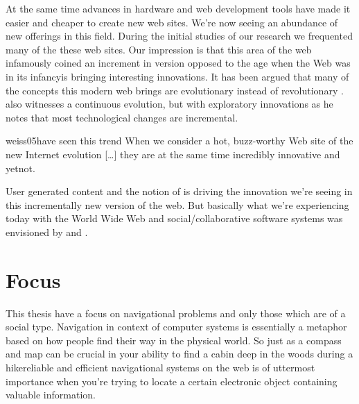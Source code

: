At the same time advances in hardware and web development tools have made it
easier and cheaper to create new web sites. We're now seeing an
abundance of new offerings in this field.
During the initial studies of our research we frequented
many of the these web sites. Our impression is that
this area of the web infamously coined \dash{}an
increment in version opposed to the age when the Web was in its
infancy\dash{}is bringing interesting innovations.
It has been argued that many of the concepts this modern web brings are
evolutionary instead of revolutionary \citep[]{yakovlev07}.
\citet[]{treese06} also witnesses a continuous evolution, but with
exploratory innovations as he notes that most technological changes are
incremental.%
\begin{fullquote}[\p{18}]{weiss05}{have seen this trend}
  When we consider a hot, buzz-worthy Web site of the new Internet evolution
  [\ldots]
  they are at the same time incredibly innovative and yet\dash{}not.
\end{fullquote}

User generated content and the notion of %
is driving the innovation we're seeing in this incrementally new version of
the web. But basically what we're experiencing today with the World Wide Web
and social/collaborative software systems was envisioned by
\citet{licklider68} and
\citet{bush45}.

\section{Focus}

This thesis have a focus on navigational problems and only those
which are of a social type.%
Navigation in context of computer systems is
essentially a metaphor based on how people find their way in the physical
world. So just as a compass and map can be crucial in your ability to find a
cabin deep in the woods during a hike\dash{}reliable and efficient
navigational systems on the web is of uttermost importance when you're trying
to locate a certain electronic object containing valuable information.

